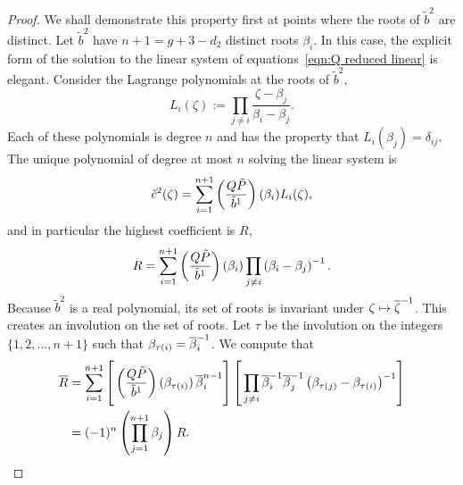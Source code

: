 \documentclass{article}
\begin{document}
\begin{lem}
\begin{proof}
We shall demonstrate this property first at points where the roots of $\tilde{b}^2$ are distinct. Let $\tilde{b}^2$ have $n+1 = g+3 - d_2$ distinct roots $\beta_i$. In this case, the explicit form of the solution to the linear system of equations~\eqref{eqn:Q reduced linear} is elegant. Consider the Lagrange polynomials at the roots of $\tilde{b}^2$,
\[
L_i (\zeta) := \prod_{j \neq i} \frac{\zeta-\beta_j}{\beta_i - \beta_j}.
\]
Each of these polynomials is degree $n$ and has the property that $L_i (\beta_j) = \delta_{ij}$. The unique polynomial of degree at most $n$ solving the linear system is
\[
\tilde{c}^2(\zeta) = \sum_{i = 1}^{n+1} \left(\frac{Q\tilde{P}}{\tilde{b}^1}\right)(\beta_{i}) L_i (\zeta),
\]
and in particular the highest coefficient is $R$,
\[
R = \sum_{i = 1}^{n+1} \left(\frac{Q\tilde{P}}{\tilde{b}^1}\right)(\beta_i) \prod_{j \neq i} \left( \beta_i - \beta_j \right)^{-1}.
\]
Because $\tilde{b}^2$ is a real polynomial, its set of roots is invariant under $\zeta \mapsto \overline{\zeta}^{-1}$. This creates an involution on the set of roots. Let $\tau$ be the involution on the integers $\{1,2,\ldots,n+1\}$ such that $\beta_{\tau(i)} = \overline{\beta}^{-1}_i$. We compute that
\begin{align*}
\bar{R}
&= \sum_{i = 1}^{n+1} 
\left[\rule{0cm}{0.7cm}  \bra{\frac{Q\tilde{P}}{\tilde{b}^1}}(\beta_{\tau(i)})\,{\bar{\beta}}_i^{n-1} \right]
\left[\rule{0cm}{0.7cm}  \prod_{j \neq i} \cji{\beta}_i \cji{\beta}_j \bra{ \beta_{\tau(j)} - \beta_{\tau(i)} }^{-1}\right] \\
&= (-1)^{n}\bra{ \prod_{j=1}^{n+1}  \beta_j }  R.
\end{align*}


\end{proof}
\end{lem}
\end{document}
